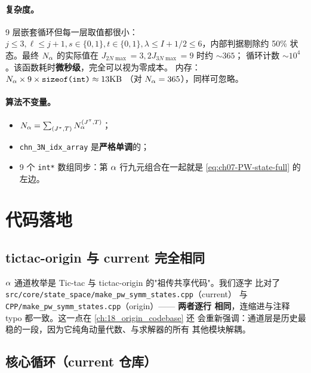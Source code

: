 \paragraph{复杂度。}
9 层嵌套循环但每一层取值都很小：\(j \le 3, \ell \le j+1, s \in \{0,1\},
t \in \{0,1\}, \lambda \le I + 1/2 \le 6\)，内部判据剔除约 50\% 状态。最终
\(N_\alpha\) 的实际值在 \(J_{2N\max}=3, 2J_{3N\max}=9\) 时约 \(\sim 365\)；
循环计数 \(\sim 10^4\)。该函数耗时\textbf{微秒级}，完全可以视为零成本。
内存：\(N_\alpha \times 9 \times \texttt{sizeof(int)} \approx 13 \text{KB}\)
（对 \(N_\alpha = 365\)），同样可忽略。

\paragraph{算法不变量。}
\begin{itemize}
  \item \(N_\alpha = \sum_{(J^\pi, T)} N_\alpha^{(J^\pi, T)}\)；
  \item \texttt{chn\_3N\_idx\_array} 是\textbf{严格单调}的；
  \item 9 个 \texttt{int*} 数组同步：第 \(\alpha\) 行九元组合在一起就是
        \cref{eq:ch07-PW-state-full} 的左边。
\end{itemize}

\section{代码落地}
\label{sec:ch07-code}

\subsection{tictac-origin 与 current 完全相同}
\label{subsec:ch07-origin-current}

\(\alpha\) 通道枚举是 Tic-tac 与 tictac-origin 的"祖传共享代码"。我们逐字
比对了 \texttt{src/core/state\_space/make\_pw\_symm\_states.cpp}（current）
与 \texttt{CPP/make\_pw\_symm\_states.cpp}（origin）—— \textbf{两者逐行
相同}，连缩进与注释 typo 都一致。这一点在 \cref{ch:18_origin_codebase} 还
会重新强调：通道层是历史最稳的一段，因为它纯角动量代数、与求解器的所有
其他模块解耦。

\subsection{核心循环（current 仓库）}
\label{subsec:ch07-core-loop}

